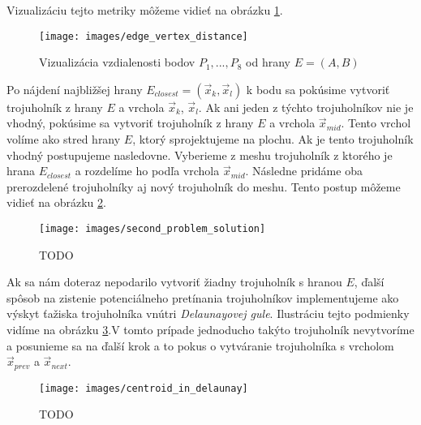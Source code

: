 Vizualizáciu tejto metriky môžeme vidieť na obrázku \ref{obr:edge_vertex_distance}.

\begin{figure}
    \centerline{\texttt{[image: images/edge\_vertex\_distance]}}
    \caption[Vizualizácia vzdialenosti bodov $P_1, ..., P_8$ od hrany $E=(A,B)$]
    {Vizualizácia vzdialenosti bodov $P_1, ..., P_8$ od hrany $E=(A,B)$}
    \label{obr:edge_vertex_distance}
\end{figure}

Po nájdení najbližšej hrany $E_{closest} = (\overrightarrow{x}_k, \overrightarrow{x}_l)$ 
k bodu sa pokúsime vytvoriť trojuholník z hrany $E$ a vrchola $\overrightarrow{x}_k$, 
$\overrightarrow{x}_l$. Ak ani jeden z týchto trojuholníkov nie je vhodný, pokúsime sa 
vytvoriť trojuholník z hrany $E$ a vrchola $\overrightarrow{x}_{mid}$. Tento vrchol 
volíme ako stred hrany $E$, ktorý sprojektujeme na plochu. Ak je tento trojuholník vhodný
postupujeme nasledovne. Vyberieme z meshu trojuholník z ktorého je hrana $E_{closest}$ a
rozdelíme ho podľa vrchola $\overrightarrow{x}_{mid}$. Následne pridáme oba prerozdelené
trojuholníky aj nový trojuholník do meshu. Tento postup môžeme vidieť na obrázku 
\ref{obr:second_problem_solution}.

\begin{figure}
    \centerline{\texttt{[image: images/second\_problem\_solution]}}
    \caption[TODO]{TODO}
    \label{obr:second_problem_solution}
\end{figure}

Ak sa nám doteraz nepodarilo vytvoriť žiadny trojuholník s hranou $E$, ďalší spôsob na 
zistenie potenciálneho pretínania trojuholníkov implementujeme ako 
výskyt ťažiska trojuholníka vnútri \textit{Delaunayovej gule}. Ilustráciu tejto podmienky
vidíme na obrázku \ref{obr:centroid_in_delaunay}.V tomto prípade jednoducho
takýto trojuholník nevytvoríme a posunieme sa na ďalší krok a to pokus o vytváranie trojuholníka
s vrcholom $\overrightarrow{x}_{prev}$ a $\overrightarrow{x}_{next}$. 

\begin{figure}
    \centerline{\texttt{[image: images/centroid\_in\_delaunay]}}
    \caption[TODO]{TODO}
    \label{obr:centroid_in_delaunay}
\end{figure}

